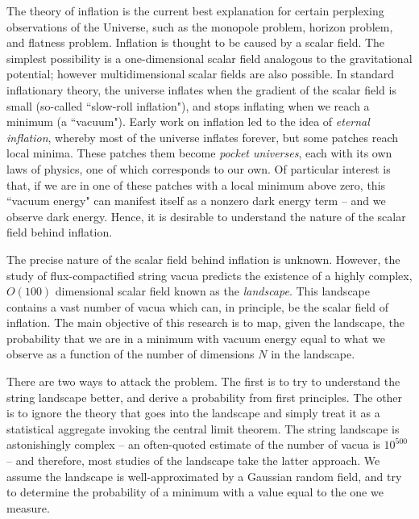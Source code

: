 \documentclass[12pt]{article}
\begin{document}

The theory of inflation is the current best explanation for certain perplexing observations of the Universe, such as the monopole problem, horizon problem, and flatness problem.\cite{Ryden} 
Inflation is thought to be caused by a scalar field. The simplest possibility is a one-dimensional scalar field analogous to the gravitational potential; however multidimensional scalar fields are also possible. In standard inflationary theory, the universe inflates when the gradient of the scalar field is small (so-called ``slow-roll inflation"), and stops inflating when we reach a minimum (a ``vacuum"). Early work on inflation led to the idea of \emph{eternal inflation}, whereby most of the universe inflates forever, but some patches reach local minima. These patches them become \emph{pocket universes}, each with its own laws of physics, one of which corresponds to our own. Of particular interest is that, if we are in one of these patches with a local minimum above zero, this ``vacuum energy" can manifest itself as a nonzero dark energy term -- and we observe dark energy. Hence, it is desirable to understand the nature of the scalar field behind inflation.

The precise nature of the scalar field behind inflation is unknown. However, the study of flux-compactified string vacua predicts the existence of a highly complex, $O(100)$ dimensional scalar field known as the \emph{landscape}. This landscape contains a vast number of vacua which can, in principle, be the scalar field of inflation. The main objective of this research is to map, given the landscape, the probability that we are in a minimum with vacuum energy equal to what we observe as a function of the number of dimensions $N$ in the landscape. 

There are two ways to attack the problem. The first is to try to understand the string landscape better, and derive a probability from first principles. The other is to ignore the theory that goes into the landscape and simply treat it as a statistical aggregate invoking the central limit theorem. The string landscape is astonishingly complex -- an often-quoted estimate of the number of vacua is $10^{500}$\cite{Douglas} -- and therefore, most studies of the landscape take the latter approach.\cite{GRF1, GRF2, GRF3} We assume the landscape is well-approximated by a Gaussian random field, and try to determine the probability of a minimum with a value equal to the one we measure.
\end{document}
